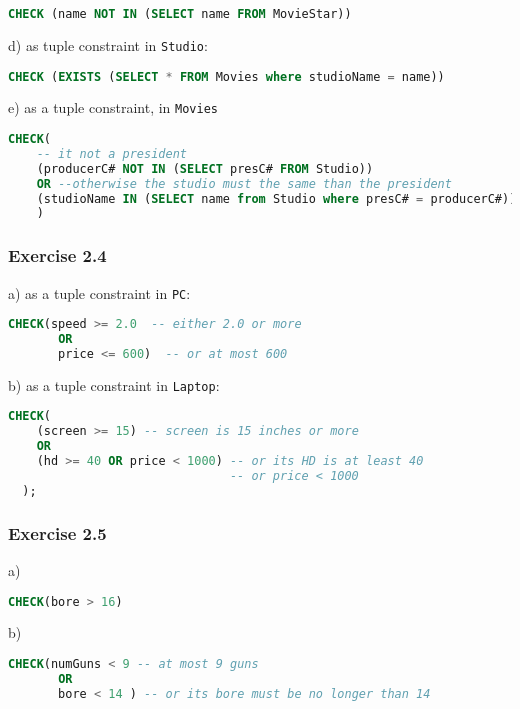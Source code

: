 \documentclass[../../main.tex]{subfiles}
\begin{document}
\begin{lstlisting}[language=sql]
  CHECK (name NOT IN (SELECT name FROM MovieStar))
\end{lstlisting}

d) as tuple constraint in \verb|Studio|:

\begin{lstlisting}[language=sql]
  CHECK (EXISTS (SELECT * FROM Movies where studioName = name))
\end{lstlisting}

e) as a tuple constraint, in \verb|Movies|

\begin{lstlisting}[language=sql]
  CHECK(
    -- it not a president
    (producerC# NOT IN (SELECT presC# FROM Studio))
    OR --otherwise the studio must the same than the president
    (studioName IN (SELECT name from Studio where presC# = producerC#))
    )
\end{lstlisting}

\subsubsection*{Exercise 2.4}

a) as a tuple constraint in \verb|PC|:

\begin{lstlisting}[language=sql]
  CHECK(speed >= 2.0  -- either 2.0 or more
       OR
       price <= 600)  -- or at most 600
\end{lstlisting}

b) as a tuple constraint in \verb|Laptop|:

\begin{lstlisting}[language=sql]
  CHECK(
    (screen >= 15) -- screen is 15 inches or more
    OR
    (hd >= 40 OR price < 1000) -- or its HD is at least 40
                               -- or price < 1000
  );
\end{lstlisting}

\subsubsection*{Exercise 2.5}

a)

\begin{lstlisting}[language=sql]
  CHECK(bore > 16)
\end{lstlisting}

b)

\begin{lstlisting}[language=sql]
  CHECK(numGuns < 9 -- at most 9 guns
       OR
       bore < 14 ) -- or its bore must be no longer than 14
\end{lstlisting}
\end{document}
